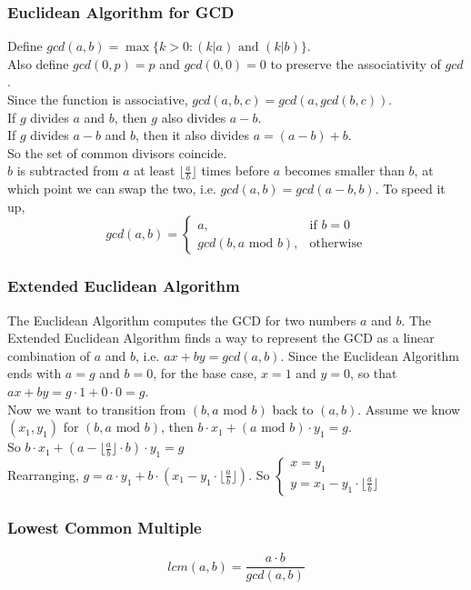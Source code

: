 \documentclass[12pt]{extarticle}
\begin{document}
\subsubsection*{Euclidean Algorithm for GCD}
Define $gcd(a,b)=\max\{k>0:(k|a)\text{ and }(k|b)\}$. \\
Also define $gcd(0,p)=p$ and $gcd(0,0)=0$ to preserve the associativity of $gcd$.\\
Since the function is associative, $gcd(a,b,c)=gcd(a,gcd(b,c))$.\\
If $g$ divides $a$ and $b$, then $g$ also divides $a-b$.\\
If $g$ divides $a-b$ and $b$, then it also divides $a=(a-b)+b$.\\
So the set of common divisors coincide.\\
$b$ is subtracted from $a$ at least $\lfloor\frac{a}{b}\rfloor$ times before $a$ becomes smaller than $b$, at which point we can swap the two, i.e. $gcd(a,b)=gcd(a-b,b)$. To speed it up, $$gcd(a,b)=\begin{cases}a, &\text{if }b=0\\gcd(b,a \text{ mod }b),&\text{otherwise} \end{cases}$$
\subsubsection*{Extended Euclidean Algorithm}
The Euclidean Algorithm computes the GCD for two numbers $a$ and $b$. The Extended Euclidean Algorithm finds a way to represent the GCD as a linear combination of $a$ and $b$, i.e. $ax+by=gcd(a,b)$. Since the Euclidean Algorithm ends with $a=g$ and $b=0$, for the base case, $x=1$ and $y=0$, so that $ax+by=g\cdot 1+0\cdot 0=g$.\\
Now we want to transition from $(b, a\text{ mod } b)$ back to $(a,b)$. Assume we know $(x_{1}, y_{1})$ for $(b, a\text{ mod } b)$, then $b\cdot x_{1}+(a \text{ mod }b )\cdot y_{1}=g$.\\
So $b\cdot x_{1}+(a-\lfloor\frac{a}{b}\rfloor\cdot b)\cdot y_{1}=g$\\
Rearranging, $g=a\cdot y_{1}+b\cdot(x_{1}-y_{1}\cdot\lfloor\frac{a}{b}\rfloor)$. So $\begin{cases}x=y_{1}\\ y=x_{1}-y_{1}\cdot\lfloor\frac{a}{b}\rfloor\end{cases}$
\subsubsection*{Lowest Common Multiple}
$$lcm(a,b)=\frac{a\cdot b}{gcd(a,b)}$$
\end{document}
